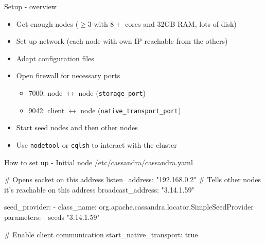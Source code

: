 \documentclass[
  10pt
]{beamer}
\begin{document}
\begin{frame}{Setup - overview}
  \begin{itemize}
    \item<1-> Get enough nodes ($\geq3$ with $8+$ cores and 32GB RAM, lots of disk)
    \item<2-> Set up network (each node with own IP reachable from the others)
    \item<3-> Adapt configuration files
    \item<4-> Open firewall for necessary ports
    \begin{itemize}
      \item 7000: node $\leftrightarrow$ node (\lstinline{storage_port})
      \item 9042: client $\leftrightarrow$ node (\lstinline{native_transport_port})
    \end{itemize}
    \item<5-> Start seed nodes and then other nodes
    \item<6-> Use \lstinline{nodetool} or \lstinline{cqlsh} to interact with the cluster
  \end{itemize}
\end{frame}

\begin{frame}[fragile]{How to set up - Initial node}
/etc/cassandra/cassandra.yaml
\begin{semiverbatim}
# Opens socket on this address
listen_address: "192.168.0.2"
# Tells other nodes it's reachable on this address
broadcast_address: "3.14.1.59"

seed_provider:
  - class_name: org.apache.cassandra.locator.SimpleSeedProvider
    parameters:
      - seeds "3.14.1.59"

# Enable client communication
start_native_transport: true
\end{semiverbatim}
\end{frame}
\end{document}
